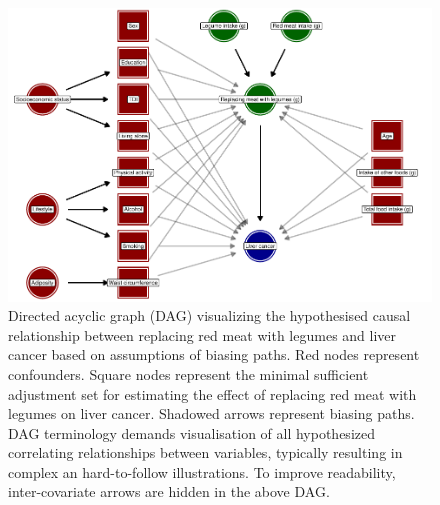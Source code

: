 \documentclass[sn-basic,Numbered,pdflatex]{sn-jnl}
\begin{document}
\begin{figure}[b]
\includegraphics[width=1\linewidth,]{Springer-test_files/figure-latex/fig2-1} \caption{Directed acyclic graph (DAG) visualizing the hypothesised causal relationship between replacing red meat with legumes and liver cancer based on assumptions of biasing paths. Red nodes represent confounders. Square nodes represent the minimal sufficient adjustment set for estimating the effect of replacing red meat with legumes on liver cancer. Shadowed arrows represent biasing paths. DAG terminology demands visualisation of all hypothesized correlating relationships between variables, typically resulting in complex an hard-to-follow illustrations. To improve readability, inter-covariate arrows are hidden in the above DAG.}\label{fig:fig2}
\end{figure}

\newpage
\end{document}
